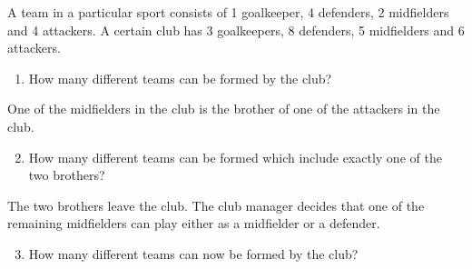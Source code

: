 \begin{problem}
    A team in a particular sport consists of 1 goalkeeper, 4 defenders, 2 midfielders and 4 attackers. A certain club has 3 goalkeepers, 8 defenders, 5 midfielders and 6 attackers.

    \begin{enumerate}
        \item How many different teams can be formed by the club?
    \end{enumerate}

    One of the midfielders in the club is the brother of one of the attackers in the club.

    \begin{enumerate}
        \setcounter{enumi}{1}
        \item How many different teams can be formed which include exactly one of the two brothers?
    \end{enumerate}

    The two brothers leave the club. The club manager decides that one of the remaining midfielders can play either as a midfielder or a defender.

    \begin{enumerate}
        \setcounter{enumi}{2}
        \item How many different teams can now be formed by the club?
    \end{enumerate}
\end{problem}
